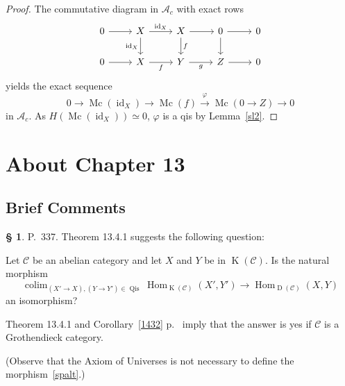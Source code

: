 \documentclass[12pt]{article}
\theoremstyle{remark}
\theoremstyle{definition}
\newtheorem{s}[thm]{\S}
\newcommand{\oo}{\operatorname}
\newcommand{\A}{\mathcal A}
\newcommand{\C}{\mathcal C}
\newcommand{\pp}{\varphi}
\newcommand{\xr}{\xrightarrow}
\DeclareMathOperator*{\colim}{colim}
\DeclareMathOperator{\id}{id}
\DeclareMathOperator{\Hom}{Hom}
\DeclareMathOperator{\Mc}{Mc}
\begin{document}
\begin{proof}
The commutative diagram in $\A_c$ with exact rows 
$$
\begin{tikzcd}
0\ar{r}&X\ar{d}[swap]{\id_X}\ar{r}{\id_X}&X\ar{d}{f}\ar{r}&0\ar{d}\ar{r}&0\\ 
0\ar{r}&X\ar{r}[swap]{f}&Y\ar{r}[swap]{g}&Z\ar{r}&0
\end{tikzcd}
$$ 
yields the exact sequence 
$$
0\to\Mc(\id_X)\to\Mc(f)\xr\pp\Mc(0\to Z)\to0
$$
in $\A_c$. As $H(\Mc(\id_X))\simeq0$, $\pp$ is a qis by Lemma~\ref{sl2}.
\end{proof}


\section{About Chapter 13}

\subsection{Brief Comments}

\begin{s}
P.~337. Theorem 13.4.1 suggests the following question: 

Let $\C$ be an abelian category and let $X$ and $Y$ be in $\oo K(\C)$. Is the natural morphism 
%
\begin{equation}\label{spalt}
\colim_{(X'\to X),(Y\to Y')\in\oo{Qis}}\Hom_{\oo K(\C)}(X',Y')\to\Hom_{\oo D(\C)}(X,Y)
\end{equation}
%
an isomorphism?

Theorem 13.4.1 and Corollary~\ref{1432} p.~\pageref{1432} imply that the answer is yes if $\C$ is a Grothendieck category. 

(Observe that the Axiom of Universes is not necessary to define the morphism~\eqref{spalt}.)
\end{s}

%
\end{document}
